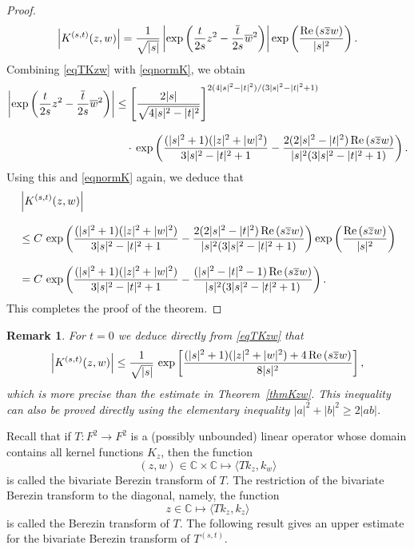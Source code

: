 \documentclass[reqno]{amsart}
\newtheorem{remark}[theorem]{Remark}
\newcommand{\C}{{\mathbb C}}
\DeclareMathOperator{\re}{{\rm Re}\,}
\begin{document}
\begin{proof}
\begin{equation}\label{eqnormK}
\left| K^{(s,t)}(z,w)\right|=\frac{1}{\sqrt{|s|}}\left|\exp\left(\frac{t}{2s}z^2
-\frac{\overline{t}}{2s}\overline{w}^2\right)\right|
\exp\left(\frac{\re ({s\overline{z}w})}{|s|^2}\right).
\end{equation}
Combining \eqref{eqTKzw} with \eqref{eqnormK}, we obtain
\begin{align*}
\left|\exp\left(\frac{t}{2s}z^2-\frac{\overline{t}}{2s}\overline{w}^2
\right)\right|&\leq\left[\frac{2{|s|}}{\sqrt{4|s|^2-|t|^2}}
\right]^{2(4|s|^2-|t|^2)/(3|s|^2-|t|^2+1)}\\[8pt]
&\quad\cdot\,\exp\left(\frac{(|s|^2+1)(|z|^2+|w|^2)}{3|s|^2-|t|^2+1}
-\frac{2(2|s|^2-|t|^2)\re({s\overline{z}w})}{|s|^2(3|s|^2-|t|^2+1)}\right).
\end{align*}
Using this and \eqref{eqnormK} again, we deduce that
\begin{align*}
&\left|K^{(s,t)}(z,w)\right|\\[8pt]
&\leq C\,\exp\left(\frac{(|s|^2+1)(|z|^2+|w|^2)}
{3|s|^2-|t|^2+1}-\frac{2(2|s|^2-|t|^2)\re ({s\overline{z}w})}
{|s|^2(3|s|^2-|t|^2+1)}\right)\exp\left(\frac{\re ({s\overline{z}w})}
{|s|^2}\right)\\[8pt]
&=C\,\exp\left(\frac{(|s|^2+1)(|z|^2+|w|^2)}{3|s|^2-|t|^2+1}
-\frac{(|s|^2-|t|^2-1)\re({s\overline{z}w})}{|s|^2(3|s|^2-|t|^2+1)}\right).
\end{align*}
This completes the proof of the theorem.
\end{proof}

\begin{remark}
For $t=0$ we deduce directly from \eqref{eqTKzw} that
$$\left|K^{(s,t)}(z,w)\right|\leq\frac{1}{\sqrt{|s|}}\,
\exp\left[\frac{(|s|^2+1)(|z|^2+|w|^2)+4\re ({s\overline{z}w})}
{8|s|^2}\right],$$
which is more precise than the estimate in Theorem~\ref{thmKzw}.
This inequality can also be proved directly using the elementary inequality
$|a|^2+ |b|^2\geq 2|ab|$.
\end{remark}

Recall that if $T: F^2\to F^2$ is a (possibly unbounded) linear operator
whose domain contains all kernel functions $K_z$, then the function
$$(z,w)\in\C\times\C\mapsto\langle Tk_z, k_w\rangle$$
is called the bivariate Berezin transform of $T$. The restriction of the
bivariate Berezin transform to the diagonal, namely, the function
$$z\in\C\mapsto\langle Tk_z, k_z\rangle$$
is called the Berezin transform of $T$. The following result gives an
upper estimate for the bivariate Berezin transform of $T^{(s,t)}$.
\end{document}
